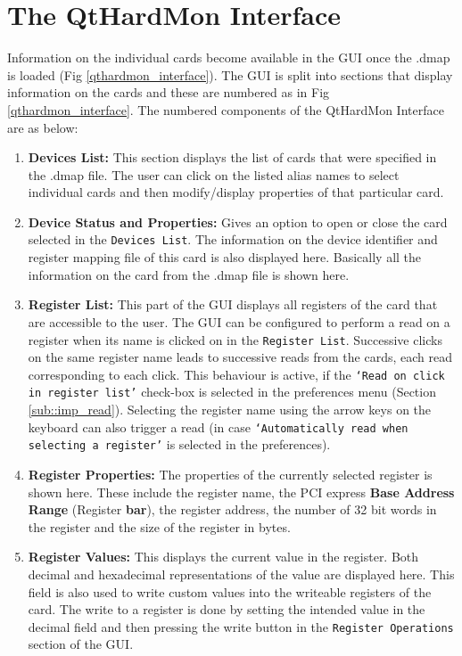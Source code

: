 \section{The QtHardMon Interface}
Information on the individual cards become available in the GUI once the .dmap is loaded (Fig \ref{qthardmon_interface}). The GUI is split into sections that display information on the cards and these are numbered as in Fig \ref{qthardmon_interface}. The numbered components of the QtHardMon Interface are as below:
\begin{enumerate}
\item \textbf{Devices List:} This section displays the list of cards that were specified in the .dmap file. The user can click on the listed alias names to select individual cards and then modify/display properties of that particular card. 

\item \textbf{Device Status and Properties:} Gives an option to open or close the card selected in the \texttt{Devices List}. The information on the device identifier and register mapping file of this card is also displayed here. Basically all the information on the card from the .dmap file is shown here. 

\item \textbf{Register List:} This part of the GUI displays all registers of the card that are accessible to the user. The GUI can be configured to perform a read on a register when its name is clicked on in the \texttt{Register List}. Successive clicks on the same register name leads to successive reads from the cards, each read corresponding to each click. This behaviour is active, if the \texttt{`Read on click in register list'} check-box is selected in the preferences menu (Section \ref{sub::imp_read}). Selecting the register name using the arrow keys on the keyboard can also trigger a read (in case \texttt{`Automatically read when selecting a register'} is selected in the preferences).

\item \textbf{Register Properties:} The properties of the currently selected register is shown here. These include the register name, the PCI express \textbf{Base Address Range} (Register \textbf{bar}), the register address, the number of 32 bit words in the register and the size of the register in bytes.

\item \textbf{Register Values:} This displays the current value in the register. Both decimal and hexadecimal representations of the value are displayed here. This field is also used to write custom values into the writeable registers of the card. The write to a register is done by setting the intended value in the decimal field and then pressing the write button in the \texttt{Register Operations} section of the GUI.


\end{enumerate}

